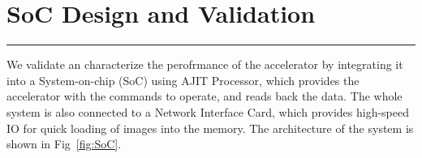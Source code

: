 \documentclass[12pt]{report}
\begin{document}
 

\newpage
\chapter{SoC Design and Validation} \label{3}
\rule[10pt]{\linewidth}{3pt}
We validate an characterize the perofrmance of the accelerator by integrating it into a System-on-chip (SoC) using AJIT Processor, which provides the accelerator with the commands to operate, and reads back the data. The whole system is also connected to a Network Interface Card, which provides high-speed IO for quick loading of images into the memory. The architecture of the system is shown in Fig~\ref{fig:SoC}.
\\
\end{document}
